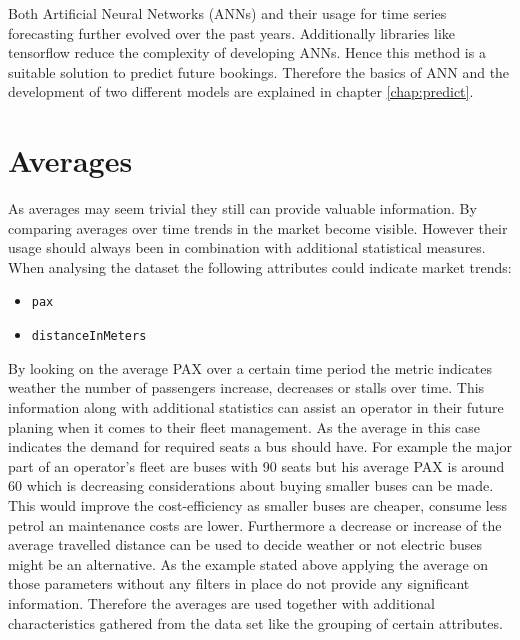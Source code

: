 Both Artificial Neural Networks (ANNs) and their usage for time series forecasting further evolved over the past years. Additionally libraries like tensorflow  reduce the complexity of developing ANNs. Hence this method is a suitable solution to predict future bookings. Therefore the basics of ANN and the development of two different models are explained in chapter \ref{chap:predict}.

\section{Averages}
\label{sec:averages}
As averages may seem trivial they still can provide valuable information. By comparing averages over time trends in the market become visible. However their usage should always been in combination with additional statistical measures. When analysing the dataset the following attributes could indicate market trends: 
\begin{itemize}
\item \verb|pax|
\item \verb|distanceInMeters|
\end{itemize}
By looking on the average PAX over a certain time period the metric indicates weather the number of passengers increase, decreases or stalls over time. This information along with additional statistics can assist an operator in their future planing when it comes to their fleet management. As the average in this case indicates the demand for required seats a bus should have. For example the major part of an operator's fleet are buses with 90 seats but his average PAX is around 60 which is decreasing considerations about buying smaller buses can be made. This would improve the cost-efficiency as smaller buses are cheaper, consume less petrol an maintenance costs are lower. Furthermore a decrease or increase of the average travelled distance can be used to decide weather or not electric buses might be an alternative.
As the example stated above applying the average on those parameters without any filters in place do not provide any significant information. Therefore the averages are used together with additional characteristics gathered from the data set like the grouping of certain attributes. 

